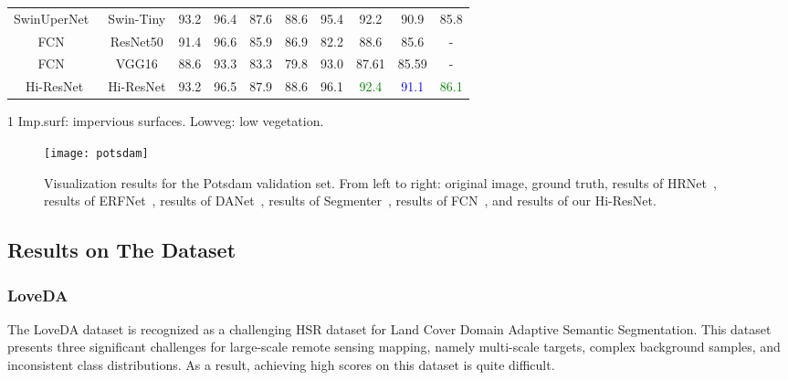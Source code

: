 \documentclass[journal]{IEEEtran}
\begin{document}
\begin{table*}[!t]
\begin{center}
\begin{threeparttable}
{\begin{tabular}{c|c c c c c c c c c}
      SwinUperNet~\cite{liu2021swin} & Swin-Tiny & 93.2 & 96.4 & 87.6 & 88.6 & 95.4 & 92.2 & 90.9 & 85.8\\
      FCN~\cite{long2015fully} & ResNet50 & 91.4 & 96.6 & 85.9 & 86.9 & 82.2 & 88.6 & 85.6 & -\\
      FCN~\cite{long2015fully} & VGG16 & 88.6 & 93.3 & 83.3 & 79.8 & 93.0 & 87.61 & 85.59 & -\\
      \hline
      Hi-ResNet & Hi-ResNet & 93.2 & 96.5 & 87.9 & 88.6 & 96.1 & \textcolor{green}{92.4} & \textcolor{blue}{91.1} & \textcolor{green}{86.1}\\
      \hline
    \end{tabular}}
    \begin{tablenotes}
        \footnotesize  
        \item[1] Imp.surf: impervious surfaces. Lowveg: low vegetation. 
      \end{tablenotes} 
    \end{threeparttable}
  \end{center}
  \label{table:9}
\end{table*}

\begin{figure*}[t!]
    \centering
    \texttt{[image: potsdam]}
    \caption{Visualization results for the Potsdam validation set. From left to right: original image, ground truth, results of HRNet~\cite{wang2020deep}, results of ERFNet~\cite{romera2017erfnet}, results of DANet~\cite{fu2019dual}, results of Segmenter~\cite{strudel2021segmenter}, results of FCN~\cite{long2015fully}, and results of our Hi-ResNet.}
    \label{fig:potsdam}
\end{figure*}
\subsection{Results on The Dataset}
\subsubsection{LoveDA}
The LoveDA dataset is recognized as a challenging HSR dataset for Land Cover Domain Adaptive Semantic Segmentation. This dataset presents three significant challenges for large-scale remote sensing mapping, namely multi-scale targets, complex background samples, and inconsistent class distributions. As a result, achieving high scores on this dataset is quite difficult.
\end{document}
